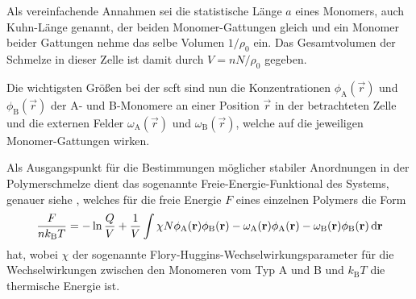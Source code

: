 \documentclass[../main.tex]{subfiles}
\begin{document}
Als vereinfachende Annahmen sei die statistische Länge $a$ eines Monomers, auch Kuhn-Länge genannt, der beiden Monomer-Gattungen gleich und ein Monomer beider Gattungen nehme das selbe Volumen $1 / \rho_{0}$ ein.
Das Gesamtvolumen der Schmelze in dieser Zelle ist damit durch $V = n N / \rho_{0}$ gegeben.

Die wichtigsten Größen bei der \ac{scft} sind nun die Konzentrationen $\phi_{\mathrm{A}}(\vec{r})$ und $\phi_{\mathrm{B}}(\vec{r})$ der A- und B-Monomere an einer Position $\vec{r}$ in der betrachteten Zelle und die externen Felder $\omega_{\mathrm{A}}(\vec{r})$ und $\omega_{\mathrm{B}}(\vec{r})$, welche auf die jeweiligen Monomer-Gattungen wirken.

Als Ausgangspunkt für die Bestimmungen möglicher stabiler Anordnungen in der Polymerschmelze dient das sogenannte Freie-Energie-Funktional des Systems, genauer siehe \cite{Matsen:2006ud,Fredrickson:2006th}, welches für die freie Energie $F$ eines einzelnen Polymers die Form
\begin{equation}
\label{eq:freie_energie_funktional}
    \frac{F}{nk_{\mathrm{B}}T} = - \ln \frac{Q}{V} + \frac{1}{V} \int \chi N \phi_{\mathrm{A}}(\mathbf{r}) \phi_{\mathrm{B}}(\mathbf{r}) - \omega_{\mathrm{A}}(\mathbf{r}) \phi_{\mathrm{A}}(\mathbf{r}) - \omega_{\mathrm{B}}(\mathbf{r}) \phi_{\mathrm{B}}(\mathbf{r}) \mathop{}\!\mathrm{d} \mathbf{r}
\end{equation}
hat, wobei $\chi$ der sogenannte Flory-Huggins-Wechselwirkungsparameter für die Wechselwirkungen zwischen den Monomeren vom Typ A und B und $k_{\mathrm{B}} T$ die thermische Energie ist.
\end{document}
